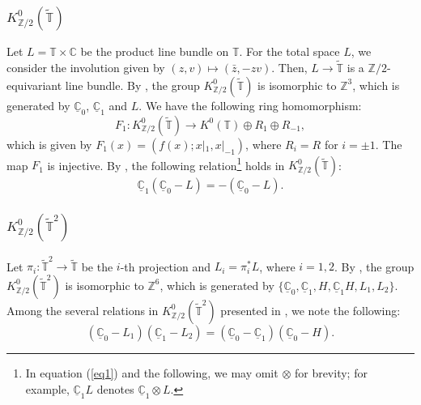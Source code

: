 \documentclass{amsart}
\theoremstyle{plain}
\theoremstyle{definition}
\theoremstyle{remark}
\newcommand{\Z}{\mathbb{Z}}
\newcommand{\C}{\mathbb{C}}
\newcommand{\T}{\mathbb{T}}
\newcommand{\tT}{\widetilde{\T}}
\newcommand{\uC}{\underline{\C}}
\begin{document}
\subsubsection{$K^0_{\Z/2}(\tT)$}
\label{Sect3.3.2}
Let $L = \T \times \C$ be the product line bundle on $\T$.
For the total space $L$, we consider the involution given by $(z,v) \mapsto (\bar{z}, -zv)$.
Then, $L \to \tT$ is a $\Z/2$-equivariant line bundle.
By \cite[Lemma~4.3]{Gomi15}, the group $K^0_{\Z/2}(\tT)$ is isomorphic to $\Z^3$, which is generated by $\uC_0$, $\uC_1$ and $L$.
We have the following ring homomorphism:
\begin{equation*}
F_1 \colon K^0_{\Z/2}(\tT) \to K^0(\T) \oplus R_{1} \oplus R_{-1},
\end{equation*}
which is given by $F_1(x) = (f(x); x|_1, x|_{-1})$, where $R_i = R$ for $i=\pm1$.
The map $F_1$ is injective.
By \cite[Lemma~4.3]{Gomi15}, the following relation\footnote{In equation (\ref{eq1}) and the following, we may omit $\otimes$ for brevity; for example, $\uC_1 L$ denotes $\uC_1 \otimes L$.} holds in $K^0_{\Z/2}(\tT)$:
\begin{equation}
\label{eq1}
	\uC_1(\uC_0 - L) = - (\uC_0 - L).
\end{equation}

\subsubsection{$K^0_{\Z/2}(\tT^2)$}
\label{Sect3.3.3}
Let $\pi_i \colon \tT^2 \to \tT$ be the $i$-th projection and $L_i = \pi_i^*L$, where $i=1,2$.
By \cite[Lemma~4.4]{Gomi15}, the group $K^0_{\Z/2}(\tT^2)$ is isomorphic to $\Z^6$, which is generated by
$\{ \uC_0, \uC_1, H, \uC_1H, L_1, L_2\}$.
Among the several relations in $K^0_{\Z/2}(\tT^2)$ presented in \cite[Lemma~4.4]{Gomi15}, we note the following:
\begin{equation}
\label{eq2}
	(\uC_0 - L_1)(\uC_1 - L_2) = (\uC_0 - \uC_1)(\uC_0 - H).
\end{equation}
\end{document}
